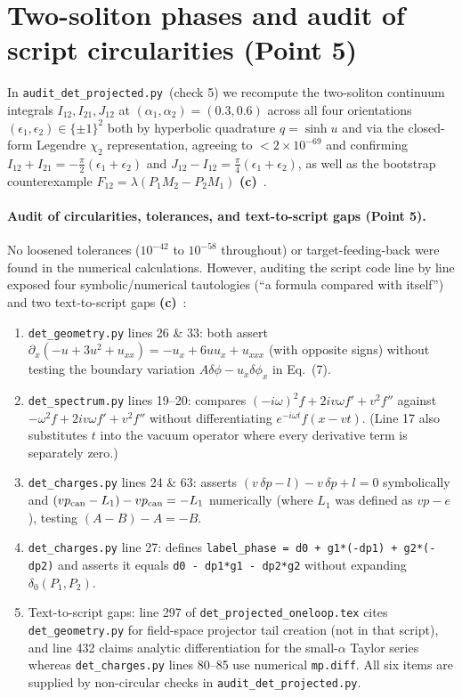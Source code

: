 \documentclass[11pt,a4paper]{article}
\newcommand{\Lc}{\textsf{\textbf{(c)}}\ }
\newcommand{\scr}{\texttt{audit\_\allowbreak det\_\allowbreak projected.py}}
\begin{document}
\section{Two-soliton phases and audit of script circularities (Point 5)}
In \scr\ (check 5) we recompute the two-soliton continuum integrals $I_{12},I_{21},J_{12}$
at $(\alpha_1,\alpha_2)=(0.3,0.6)$ across all four orientations $(\epsilon_1,\epsilon_2)\in\{\pm1\}^2$
both by hyperbolic quadrature $q=\sinh u$ and via the closed-form Legendre
$\chi_2$ representation, agreeing to $<2\times10^{-69}$ and confirming
$I_{12}+I_{21}=-\frac\pi2(\epsilon_1+\epsilon_2)$ and
$J_{12}-I_{12}=\frac\pi4(\epsilon_1+\epsilon_2)$, as well as the bootstrap
counterexample $F_{12}=\lambda(P_1M_2-P_2M_1)$ \Lc.

\paragraph{Audit of circularities, tolerances, and text-to-script gaps (Point 5).}
No loosened tolerances ($10^{-42}$ to $10^{-58}$ throughout) or target-feeding-back
were found in the numerical calculations. However, auditing the script code line
by line exposed four symbolic/numerical tautologies (``a formula compared with
itself'') and two text-to-script gaps \Lc:
\begin{enumerate}
\item \texttt{det\_geometry.py} lines 26 \& 33: both assert
$\partial_x(-u+3u^2+u_{xx})=-u_x+6uu_x+u_{xxx}$ (with opposite signs) without
testing the boundary variation $A\delta\phi-u_x\delta\phi_x$ in Eq.~(7).
\item \texttt{det\_spectrum.py} lines 19--20: compares
$(-i\omega)^2f+2iv\omega f'+v^2f''$ against $-\omega^2f+2iv\omega f'+v^2f''$
without differentiating $e^{-i\omega t}f(x-vt)$. (Line 17 also substitutes $t$
into the vacuum operator where every derivative term is separately zero.)
\item \texttt{det\_charges.py} lines 24 \& 63: asserts $(v\,\delta p-l)-v\,\delta p+l=0$
symbolically and $(vp_{\rm can}-L_1)-vp_{\rm can}=-L_1$ numerically (where $L_1$
was defined as $vp-e$), testing $(A-B)-A=-B$.
\item \texttt{det\_charges.py} line 27: defines
\texttt{label\_phase = d0 + g1*(-dp1) + g2*(-dp2)} and asserts it equals
\texttt{d0 - dp1*g1 - dp2*g2} without expanding $\delta_0(P_1,P_2)$.
\item Text-to-script gaps: line 297 of \texttt{det\_projected\_oneloop.tex}
cites \texttt{det\_geometry.py} for field-space projector tail creation (not in
that script), and line 432 claims analytic differentiation for the small-$\alpha$
Taylor series whereas \texttt{det\_charges.py} lines 80--85 use numerical
\texttt{mp.diff}. All six items are supplied by non-circular checks in \scr.
\end{enumerate}
\end{document}
